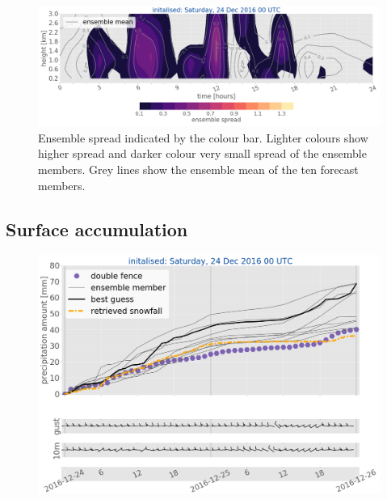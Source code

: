 \begin{figure}[h]
	\includegraphics[width=\textwidth]{./fig_ensemble_spread/20161224}
	\caption{Ensemble spread indicated by the colour bar. Lighter colours show higher spread and darker colour very small spread of the ensemble members. Grey lines show the ensemble mean of the ten forecast members.}\label{fig:spread24}
\end{figure}
%
\subsection{Surface accumulation}
\begin{figure}[h]
	\includegraphics[width=\textwidth]{./fig_sfc_acc/acc_wind_20161224_00}
	\caption{}\label{fig:sfc_acc24}
\end{figure}

